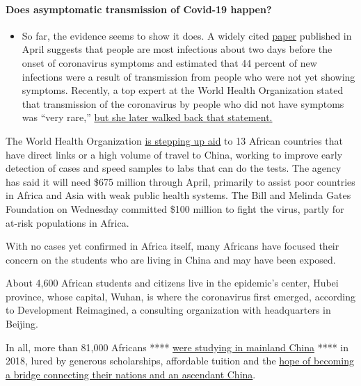 \begin{itemize}
{  \paragraph{Does asymptomatic transmission of Covid-19
  happen?}\label{does-asymptomatic-transmission-of-covid-19-happen}}

  \begin{itemize}
  \tightlist
  \item
    So far, the evidence seems to show it does. A widely cited
    \href{https://www.nature.com/articles/s41591-020-0869-5}{paper}
    published in April suggests that people are most infectious about
    two days before the onset of coronavirus symptoms and estimated that
    44 percent of new infections were a result of transmission from
    people who were not yet showing symptoms. Recently, a top expert at
    the World Health Organization stated that transmission of the
    coronavirus by people who did not have symptoms was ``very rare,''
    \href{https://www.nytimes.com/2020/06/09/world/coronavirus-updates.html?action=click\&pgtype=Article\&state=default\&region=MAIN_CONTENT_3\&context=storylines_faq\#link-1f302e21}{but
    she later walked back that statement.}
  \end{itemize}
\end{itemize}

The World Health Organization
\href{https://www.afro.who.int/news/who-ramps-preparedness-novel-coronavirus-african-region}{is
stepping up aid} to 13 African countries that have direct links or a
high volume of travel to China, working to improve early detection of
cases and speed samples to labs that can do the tests. The agency has
said it will need \$675 million through April, primarily to assist poor
countries in Africa and Asia with weak public health systems. The Bill
and Melinda Gates Foundation on Wednesday committed \$100 million to
fight the virus, partly for at-risk populations in Africa.

With no cases yet confirmed in Africa itself, many Africans have focused
their concern on the students who are living in China and may have been
exposed.

About 4,600 African students and citizens live in the epidemic's center,
Hubei province, whose capital, Wuhan, is where the coronavirus first
emerged, according to Development Reimagined, a consulting organization
with headquarters in Beijing.

In all, more than 81,000 Africans ****
\href{http://en.moe.gov.cn/news/press_releases/201904/t20190418_378586.html}{were
studying in mainland China} **** in 2018, lured by generous
scholarships, affordable tuition and the
\href{https://qz.com/africa/1119447/china-is-training-africas-next-generation-of-leaders/}{hope
of becoming a bridge connecting their nations and an ascendant China}.

